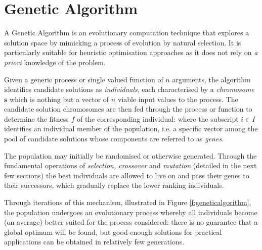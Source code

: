 
\section{Genetic Algorithm} \label{s:geneticalgo}
\newcommand{\solution}{\mathbf{s}}
A Genetic Algorithm is an evolutionary computation technique that explores a solution space by mimicking a process of evolution by natural selection. It is particularly suitable for heuristic optimisation approaches as it does not rely on \emph{a priori} knowledge of the problem.


Given a generic process or single valued function of $n$ arguments, the algorithm identifies candidate solutions as \emph{individuals}, each characterised by a \emph{chromosome} $\solution$ which is nothing but a vector of $n$ viable input values to the process. The candidate solution chromosomes are then fed through the process or function to determine the fitness $f$ of the corresponding individual:
\eq{e:gafitness}{
\omega_i = \phi(\solution_i)\qquad \mathrm{with} \quad 
\solution_i = \left\lbrace s_i^1, s_i^2, \dots s_i^n\right\rbrace
}
where the subscript $i \in I$ identifies an individual member of the population, i.e. a specific vector among the pool of candidate solutions whose components are referred to as \emph{genes}.

The population may initially be randomised or otherwise generated. Through the fundamental operations of \emph{selection, crossover} and \emph{mutation} (detailed in the next few sections) the best individuals are allowed to live on and pass their genes to their successors, which gradually replace the lower ranking individuals.


Through iterations of this mechanism, illustrated in Figure \ref{f:geneticalgorithm}, the population undergoes an evolutionary process whereby all individuals become (on average) better suited for the process considered: there is no guarantee that a global optimum will be found, but good-enough solutions for practical applications can be obtained in relatively few generations. 

